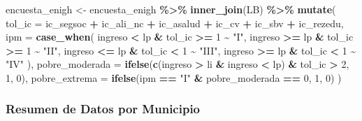 \documentclass[
  12pt,
]{book}
\newenvironment{Shaded}{\begin{snugshade}}{\end{snugshade}}
\newcommand{\AttributeTok}[1]{\textcolor[rgb]{0.13,0.29,0.53}{#1}}
\newcommand{\DecValTok}[1]{\textcolor[rgb]{0.00,0.00,0.81}{#1}}
\newcommand{\FunctionTok}[1]{\textcolor[rgb]{0.13,0.29,0.53}{\textbf{#1}}}
\newcommand{\NormalTok}[1]{#1}
\newcommand{\OtherTok}[1]{\textcolor[rgb]{0.56,0.35,0.01}{#1}}
\newcommand{\SpecialCharTok}[1]{\textcolor[rgb]{0.81,0.36,0.00}{\textbf{#1}}}
\newcommand{\StringTok}[1]{\textcolor[rgb]{0.31,0.60,0.02}{#1}}
\begin{document}
\begin{Shaded}
\begin{Highlighting}[]
\NormalTok{encuesta\_enigh }\OtherTok{\textless{}{-}}
\NormalTok{  encuesta\_enigh }\SpecialCharTok{\%\textgreater{}\%} \FunctionTok{inner\_join}\NormalTok{(LB)  }\SpecialCharTok{\%\textgreater{}\%} 
  \FunctionTok{mutate}\NormalTok{(}
    \AttributeTok{tol\_ic =}\NormalTok{ ic\_segsoc }\SpecialCharTok{+}\NormalTok{ ic\_ali\_nc }\SpecialCharTok{+}\NormalTok{ ic\_asalud }\SpecialCharTok{+}\NormalTok{ ic\_cv }\SpecialCharTok{+}\NormalTok{  ic\_sbv }\SpecialCharTok{+}\NormalTok{ ic\_rezedu,}
    \AttributeTok{ipm   =} \FunctionTok{case\_when}\NormalTok{(}
\NormalTok{      ingreso }\SpecialCharTok{\textless{}}\NormalTok{ lp  }\SpecialCharTok{\&}\NormalTok{  tol\_ic }\SpecialCharTok{\textgreater{}=} \DecValTok{1} \SpecialCharTok{\textasciitilde{}} \StringTok{"I"}\NormalTok{,}
\NormalTok{      ingreso }\SpecialCharTok{\textgreater{}=}\NormalTok{ lp }\SpecialCharTok{\&}\NormalTok{ tol\_ic }\SpecialCharTok{\textgreater{}=} \DecValTok{1} \SpecialCharTok{\textasciitilde{}} \StringTok{"II"}\NormalTok{,}
\NormalTok{      ingreso }\SpecialCharTok{\textless{}=}\NormalTok{ lp }\SpecialCharTok{\&}\NormalTok{ tol\_ic }\SpecialCharTok{\textless{}} \DecValTok{1} \SpecialCharTok{\textasciitilde{}} \StringTok{"III"}\NormalTok{,}
\NormalTok{      ingreso }\SpecialCharTok{\textgreater{}=}\NormalTok{ lp }\SpecialCharTok{\&}\NormalTok{ tol\_ic }\SpecialCharTok{\textless{}} \DecValTok{1} \SpecialCharTok{\textasciitilde{}} \StringTok{"IV"}
\NormalTok{    ),}
    \AttributeTok{pobre\_moderada =} \FunctionTok{ifelse}\NormalTok{(}\FunctionTok{c}\NormalTok{(ingreso }\SpecialCharTok{\textgreater{}}\NormalTok{ li }\SpecialCharTok{\&}\NormalTok{ ingreso }\SpecialCharTok{\textless{}}\NormalTok{ lp) }\SpecialCharTok{\&}
\NormalTok{                              tol\_ic }\SpecialCharTok{\textgreater{}} \DecValTok{2}\NormalTok{, }\DecValTok{1}\NormalTok{, }\DecValTok{0}\NormalTok{),}
    \AttributeTok{pobre\_extrema =} \FunctionTok{ifelse}\NormalTok{(ipm }\SpecialCharTok{==} \StringTok{"I"} \SpecialCharTok{\&}\NormalTok{ pobre\_moderada }\SpecialCharTok{==} \DecValTok{0}\NormalTok{, }\DecValTok{1}\NormalTok{, }\DecValTok{0}\NormalTok{)}
\NormalTok{  )}
\end{Highlighting}
\end{Shaded}

\hypertarget{resumen-de-datos-por-municipio}{%
\subsubsection*{Resumen de Datos por Municipio}\label{resumen-de-datos-por-municipio}}
\end{document}

